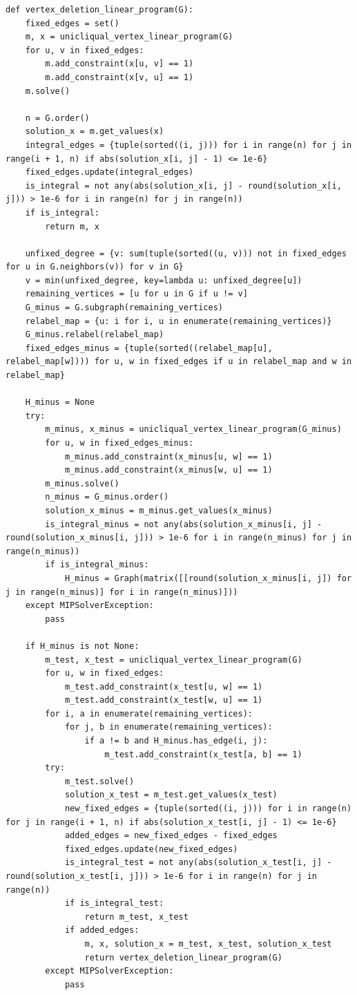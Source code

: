 \begin{lstlisting}[style=python, caption={Vertex Deletion Linear Program.}, label={lst::vertex_deletion_linear_program}]
def vertex_deletion_linear_program(G):
    fixed_edges = set()
    m, x = unicliqual_vertex_linear_program(G)
    for u, v in fixed_edges:
        m.add_constraint(x[u, v] == 1)
        m.add_constraint(x[v, u] == 1)
    m.solve()

    n = G.order()
    solution_x = m.get_values(x)
    integral_edges = {tuple(sorted((i, j))) for i in range(n) for j in range(i + 1, n) if abs(solution_x[i, j] - 1) <= 1e-6}
    fixed_edges.update(integral_edges)
    is_integral = not any(abs(solution_x[i, j] - round(solution_x[i, j])) > 1e-6 for i in range(n) for j in range(n))
    if is_integral:
        return m, x

    unfixed_degree = {v: sum(tuple(sorted((u, v))) not in fixed_edges for u in G.neighbors(v)) for v in G}
    v = min(unfixed_degree, key=lambda u: unfixed_degree[u])
    remaining_vertices = [u for u in G if u != v]
    G_minus = G.subgraph(remaining_vertices)
    relabel_map = {u: i for i, u in enumerate(remaining_vertices)}
    G_minus.relabel(relabel_map)
    fixed_edges_minus = {tuple(sorted((relabel_map[u], relabel_map[w]))) for u, w in fixed_edges if u in relabel_map and w in relabel_map}

    H_minus = None
    try:
        m_minus, x_minus = unicliqual_vertex_linear_program(G_minus)
        for u, w in fixed_edges_minus:
            m_minus.add_constraint(x_minus[u, w] == 1)
            m_minus.add_constraint(x_minus[w, u] == 1)
        m_minus.solve()
        n_minus = G_minus.order()
        solution_x_minus = m_minus.get_values(x_minus)
        is_integral_minus = not any(abs(solution_x_minus[i, j] - round(solution_x_minus[i, j])) > 1e-6 for i in range(n_minus) for j in range(n_minus))
        if is_integral_minus:
            H_minus = Graph(matrix([[round(solution_x_minus[i, j]) for j in range(n_minus)] for i in range(n_minus)]))
    except MIPSolverException:
        pass

    if H_minus is not None:
        m_test, x_test = unicliqual_vertex_linear_program(G)
        for u, w in fixed_edges:
            m_test.add_constraint(x_test[u, w] == 1)
            m_test.add_constraint(x_test[w, u] == 1)
        for i, a in enumerate(remaining_vertices):
            for j, b in enumerate(remaining_vertices):
                if a != b and H_minus.has_edge(i, j):
                    m_test.add_constraint(x_test[a, b] == 1)
        try:
            m_test.solve()
            solution_x_test = m_test.get_values(x_test)
            new_fixed_edges = {tuple(sorted((i, j))) for i in range(n) for j in range(i + 1, n) if abs(solution_x_test[i, j] - 1) <= 1e-6}
            added_edges = new_fixed_edges - fixed_edges
            fixed_edges.update(new_fixed_edges)
            is_integral_test = not any(abs(solution_x_test[i, j] - round(solution_x_test[i, j])) > 1e-6 for i in range(n) for j in range(n))
            if is_integral_test:
                return m_test, x_test
            if added_edges:
                m, x, solution_x = m_test, x_test, solution_x_test
                return vertex_deletion_linear_program(G)
        except MIPSolverException:
            pass


\end{lstlisting}
